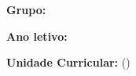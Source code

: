 \tituloEmCaixa{\tituloTrabalho}
\textbf{Grupo:} \grupo\par
\textbf{Ano letivo:} \anoLetivo\par
\textbf{Unidade Curricular:} (\codigoUC) \nomeUC\par
